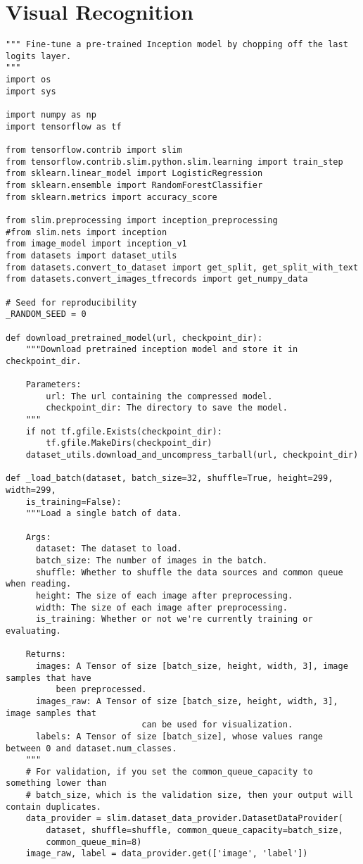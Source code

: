 \section{Visual Recognition}
\begin{lstlisting}
""" Fine-tune a pre-trained Inception model by chopping off the last logits layer. 
"""
import os
import sys

import numpy as np
import tensorflow as tf

from tensorflow.contrib import slim
from tensorflow.contrib.slim.python.slim.learning import train_step
from sklearn.linear_model import LogisticRegression
from sklearn.ensemble import RandomForestClassifier
from sklearn.metrics import accuracy_score

from slim.preprocessing import inception_preprocessing
#from slim.nets import inception
from image_model import inception_v1
from datasets import dataset_utils
from datasets.convert_to_dataset import get_split, get_split_with_text
from datasets.convert_images_tfrecords import get_numpy_data

# Seed for reproducibility
_RANDOM_SEED = 0

def download_pretrained_model(url, checkpoint_dir):
    """Download pretrained inception model and store it in checkpoint_dir.

    Parameters:
        url: The url containing the compressed model.
        checkpoint_dir: The directory to save the model.
    """
    if not tf.gfile.Exists(checkpoint_dir):
        tf.gfile.MakeDirs(checkpoint_dir)
    dataset_utils.download_and_uncompress_tarball(url, checkpoint_dir)

def _load_batch(dataset, batch_size=32, shuffle=True, height=299, width=299, 
    is_training=False):
    """Load a single batch of data. 
    
    Args:
      dataset: The dataset to load.
      batch_size: The number of images in the batch.
      shuffle: Whether to shuffle the data sources and common queue when reading.
      height: The size of each image after preprocessing.
      width: The size of each image after preprocessing.
      is_training: Whether or not we're currently training or evaluating.
    
    Returns:
      images: A Tensor of size [batch_size, height, width, 3], image samples that have 
          been preprocessed.
      images_raw: A Tensor of size [batch_size, height, width, 3], image samples that 
                           can be used for visualization.
      labels: A Tensor of size [batch_size], whose values range between 0 and dataset.num_classes.
    """
    # For validation, if you set the common_queue_capacity to something lower than
    # batch_size, which is the validation size, then your output will contain duplicates.
    data_provider = slim.dataset_data_provider.DatasetDataProvider(
        dataset, shuffle=shuffle, common_queue_capacity=batch_size,
        common_queue_min=8)
    image_raw, label = data_provider.get(['image', 'label'])
    

\end{lstlisting}
